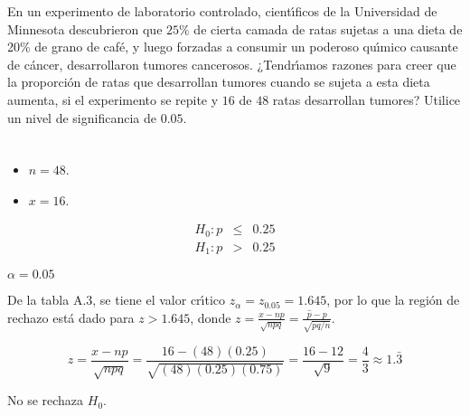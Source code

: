 \begin{enunciado}
 En un experimento de laboratorio controlado, cient\'{\i}ficos de la Universidad
 de Minnesota descubrieron que $25\%$ de cierta camada de ratas sujetas a una dieta
 de 20\% de grano de caf\'e, y luego forzadas a consumir un poderoso qu\'{\i}mico
 causante de c\'ancer, desarrollaron tumores cancerosos.
 ¿Tendr\'{\i}amos razones para creer que la proporci\'on de ratas que desarrollan
 tumores cuando se sujeta a esta dieta aumenta, si el experimento se repite
 y $16$ de $48$ ratas desarrollan tumores?
 Utilice un nivel de significancia de $0.05$.
\end{enunciado}

\begin{solucion}
 \begin{datos}
  $\phantom{0}$
  \begin{itemize}
   \item $n=48$.
   \item $x=16$.
  \end{itemize}
 \end{datos}

 \begin{hipotesis}
  \begin{eqnarray*}
   H_0: p & \leq & 0.25 \\
   H_1: p &  >   & 0.25
  \end{eqnarray*}
 \end{hipotesis}

 \begin{significancia}
  $\alpha = 0.05$
 \end{significancia}

 \begin{region}
  De la tabla A.3, se tiene el valor cr\'{\i}tico $z_{\alpha} = z_{0.05} = 1.645$,
  por lo que la regi\'on de rechazo est\'a dado para $z > 1.645$,
  donde $z = \frac{x - np}{\sqrt{npq}} 
  = \frac{\widehat{p} - p}{\sqrt{pq/n}}$.
 \end{region}

 \begin{estadistico}
  \begin{equation*}
   z = \frac{x - np}{\sqrt{npq}}
   = \frac{16 - (48)(0.25)}{\sqrt{(48)(0.25)(0.75)}}
   = \frac{16 - 12}{\sqrt{9}}
   = \frac{4}{3}
   \approx 1.\bar{3}
  \end{equation*}
 \end{estadistico}

 \begin{decision}
  No se rechaza $H_0$.
 \end{decision}


\end{solucion}
